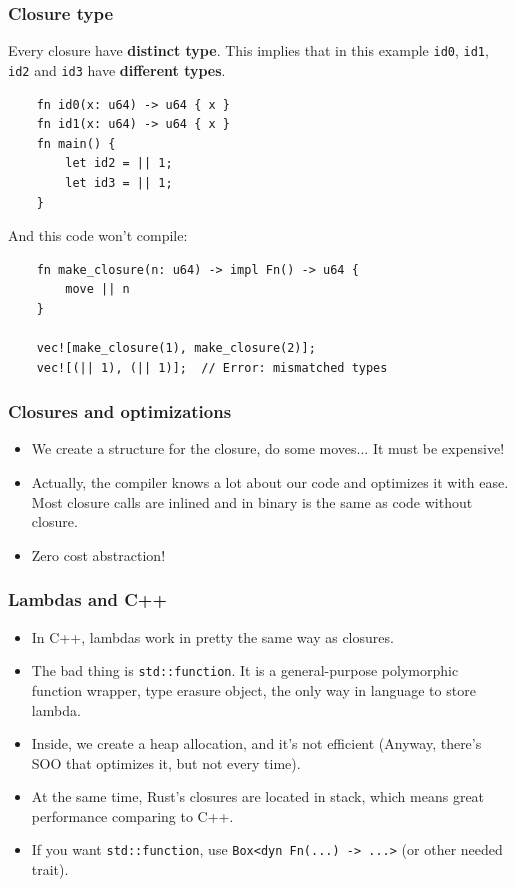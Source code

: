 \documentclass[aspectratio=1610,t]{beamer}
\begin{document}

\begin{frame}[fragile,c]
\frametitle{Closure type}
Every closure have \textbf{distinct type}. This implies that in this example \texttt{id0}, \texttt{id1}, \texttt{id2} and \texttt{id3} have \textbf{different types}.

\begin{verbatim}
    fn id0(x: u64) -> u64 { x }
    fn id1(x: u64) -> u64 { x }
    fn main() {
        let id2 = || 1;
        let id3 = || 1;
    }
\end{verbatim}

And this code won't compile:

\begin{verbatim}
    fn make_closure(n: u64) -> impl Fn() -> u64 {
        move || n
    }

    vec![make_closure(1), make_closure(2)];
    vec![(|| 1), (|| 1)];  // Error: mismatched types
\end{verbatim}
\end{frame}


\begin{frame}[fragile]
\frametitle{Closures and optimizations}
\begin{itemize}
    \item<1-> We create a structure for the closure, do some moves... It must be expensive!
    \item<2-> Actually, the compiler knows a lot about our code and optimizes it with ease. Most closure calls are inlined and in binary is the same as code without closure.
    \item<3-> Zero cost abstraction!
\end{itemize}
\end{frame}


\begin{frame}[fragile]
\frametitle{Lambdas and C++}
\begin{itemize}
    \item<1-> In C++, lambdas work in pretty the same way as closures.
    \item<2-> The bad thing is \texttt{std::function}. It is a general-purpose polymorphic function wrapper, type erasure object, the only way in language to store lambda.
    \item<3-> Inside, we create a heap allocation, and it's not efficient (Anyway, there's SOO that optimizes it, but not every time).
    \item<4-> At the same time, Rust's closures are located in stack, which means great performance comparing to C++.
    \item<5-> If you want \texttt{std::function}, use \texttt{Box<dyn Fn(...) -> ...>} (or other needed trait).
\end{itemize}
\end{frame}
\end{document}
